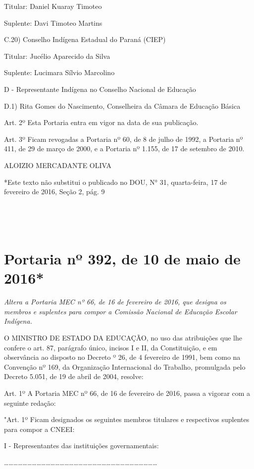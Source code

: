 \documentclass[
]{book}
\begin{document}
Titular: Daniel Kuaray Timoteo

Suplente: Davi Timoteo Martins

C.20) Conselho Indígena Estadual do Paraná (CIEP)

Titular: Jucélio Aparecido da Silva

Suplente: Lucimara Sílvio Marcolino

D - Representante Indígena no Conselho Nacional de Educação

D.1) Rita Gomes do Nascimento, Conselheira da Câmara de Educação Básica

Art. 2º Esta Portaria entra em vigor na data de sua publicação.

Art. 3º Ficam revogadas a Portaria nº 60, de 8 de julho de 1992, a Portaria nº 411, de 29 de março de 2000, e a Portaria nº 1.155, de 17 de setembro de 2010.

ALOIZIO MERCADANTE OLIVA

*Este texto não substitui o publicado no DOU, N° 31, quarta-feira, 17 de fevereiro de 2016, Seção 2, pág. 9

~

~

\hypertarget{portaria-nuxba-392-de-10-de-maio-de-2016}{%
\section{Portaria nº 392, de 10 de maio de 2016*}\label{portaria-nuxba-392-de-10-de-maio-de-2016}}

\emph{Altera a Portaria MEC nº 66, de 16 de fevereiro de 2016, que designa os membros e suplentes para compor a Comissão Nacional de Educação Escolar Indígena.}

O MINISTRO DE ESTADO DA EDUCAÇÃO, no uso das atribuições que lhe confere o art. 87, parágrafo único, incisos I e II, da Constituição, e em observância ao disposto no Decreto º 26, de 4 fevereiro de 1991, bem como na Convenção nº 169, da Organização Internacional do Trabalho, promulgada pelo Decreto 5.051, de 19 de abril de 2004, resolve:

Art. 1º A Portaria MEC nº 66, de 16 de fevereiro de 2016, passa a vigorar com a seguinte redação:

"Art. 1º Ficam designados os seguintes membros titulares e respectivos suplentes para compor a CNEEI:

I - Representantes das instituições governamentais:

\ldots\ldots\ldots\ldots\ldots\ldots\ldots\ldots\ldots\ldots\ldots\ldots\ldots\ldots\ldots\ldots\ldots\ldots\ldots\ldots\ldots\ldots\ldots\ldots\ldots\ldots\ldots\ldots\ldots\ldots\ldots\ldots\ldots{}
\end{document}
